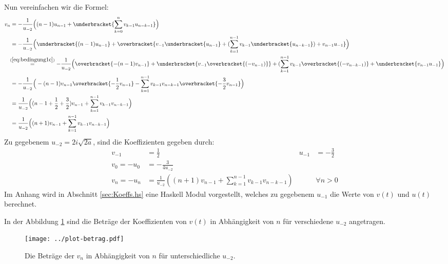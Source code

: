 \begin{comment}
und analog, für $n=1$ und $n=2$
\begin{align*}
v_1&= -\frac{3}{2u_{-2}^2} = \frac{3}{16a} = -u_1 &\mbox{und}
  & & v_2&= -\frac{63}{16u_{-2}^3} = -\frac{63i}{256a\sqrt{2a}} = -u_2 \,.
\end{align*}
Die letzten zwei Paare sind für die Berechnung nicht von Bedeutung und dienen
nur dazu, das Programm zu prüfen.
\end{comment}
Nun vereinfachen wir die Formel:
\begin{align*}
v_{n} &= -\frac{1}{u_{-2}}
  \Big((n-1)u_{n-1} + \underbracket{\sum_{k=0}^{n} v_{k-1}u_{n-k-1}}\Big)
\\&= -\frac{1}{u_{-2}}
  \Big(\underbracket{(n-1)u_{n-1}} + \overbracket{v_{-1}\underbracket{u_{n-1}}
  + (\sum_{k=1}^{n-1} v_{k-1}\underbracket{u_{n-k-1}}) + v_{n-1}u_{-1}}\Big)
\\&\!\!\overset{(\ref{eq:bedingung1c})}{=} -\frac{1}{u_{-2}}
  \Big(\overbracket{-(n-1)v_{n-1}} + \underbracket{v_{-1}\overbracket{(-v_{n-1})}}
  + (\sum_{k=1}^{n-1} v_{k-1}\overbracket{(-v_{n-k-1})}
  + \underbracket{v_{n-1}u_{-1}}\Big)
\\&= -\frac{1}{u_{-2}} \Big(-(n-1)v_{n-1} \overbracket{-\frac{1}{2}v_{n-1}}
  - \sum_{k=1}^{n-1} v_{k-1}v_{n-k-1} \overbracket{- \frac{3}{2} v_{n-1}}\Big)
\\&= \frac{1}{u_{-2}} \Big((n-1+\frac{1}{2}+\frac{3}{2})v_{n-1}
  + \sum_{k=1}^{n-1} v_{k-1}v_{n-k-1}\Big)
\\&= \frac{1}{u_{-2}} \Big((n+1)v_{n-1} + \sum_{k=1}^{n-1} v_{k-1}v_{n-k-1}\Big)
\end{align*}
Zu gegebenem $u_{-2}=2i\sqrt{2a}$, sind die Koeffizienten gegeben durch:
\begin{align*}
v_{-1}&=\frac{1}{2} & u_{-1}&=-\frac{3}{2}
\\v_{0} = -u_{0} &= -\frac{3}{4u_{-2}}
\\v_n = - u_n &= \frac{1}{u_{-2}}
  \left((n+1)v_{n-1} + \sum_{k=1}^{n-1} v_{k-1}v_{n-k-1}\right)
  & & \forall n > 0
\end{align*}
Im Anhang wird in Abschnitt \ref{sec:Koeffs.hs} eine Haskell Modul vorgestellt,
welches zu gegebenem $u_{-1}$ die Werte von $v(t)$ und $u(t)$ berechnet.

In der Abbildung \ref{fig:plotKoeffs} sind die Beträge der Koeffizienten von
$v(t)$ in Abhängigkeit von $n$ für verschiedene $u_{-2}$ angetragen.
\begin{figure}[htbp]
  \centering
  \texttt{[image: ../plot-betrag.pdf]}
  \caption%
   {Die Beträge der $v_n$ in Abhängigkeit von $n$ für unterschiedliche
     $u_{-2}$.}
  \label{fig:plotKoeffs}
\end{figure}

